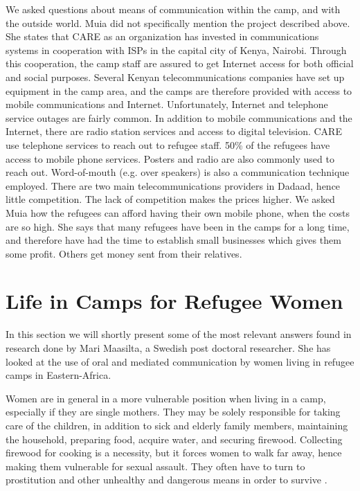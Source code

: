 We asked questions about means of communication within the camp, and with the outside world. Muia did not specifically mention the project described above. She states that CARE as an organization has invested in communications systems in cooperation with ISPs in the capital city of Kenya, Nairobi. Through this cooperation, the camp staff are assured to get Internet access for both official and social purposes. Several Kenyan telecommunications companies have set up equipment in the camp area, and the camps are therefore provided with access to mobile communications and Internet. Unfortunately, Internet and telephone service outages are fairly common. In addition to mobile communications and the Internet, there are radio station services and access to digital television. CARE use telephone services to reach out to refugee staff. 50\% of the refugees have access to mobile phone services. Posters and radio are also commonly used to reach out. Word-of-mouth (e.g. over speakers) is also a communication technique employed. There are two main telecommunications providers in Dadaad, hence little competition. The lack of competition makes the prices higher. We asked Muia how the refugees can afford having their own mobile phone, when the costs are so high. She says that many refugees have been in the camps for a long time, and therefore have had the time to establish small businesses which gives them some profit. Others get money sent from their relatives. 


\section{Life in Camps for Refugee Women}
In this section we will shortly present some of the most relevant answers found in research done by Mari Maasilta, a Swedish post doctoral researcher. She has looked at the use of oral and mediated communication by women living in refugee camps in Eastern-Africa. 

Women are in general in a more vulnerable position when living in a  camp, especially if they are single mothers. They may be solely responsible for taking care of the children, in addition to sick and elderly family members, maintaining the household, preparing food, acquire water, and securing firewood. Collecting firewood for cooking is a necessity, but it forces women  to walk far away, hence making them vulnerable for sexual assault. They often have to turn to prostitution and other unhealthy and dangerous means in order to survive \cite{womenRefugee}. 

